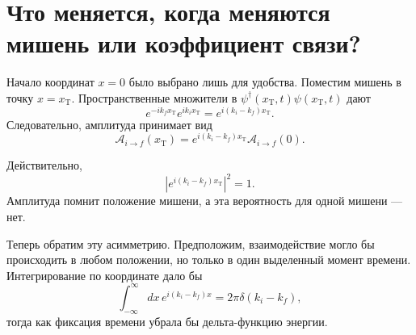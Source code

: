 \section{Что меняется, когда меняются мишень или коэффициент связи?}

Начало координат \(x=0\) было выбрано лишь для удобства. Поместим мишень в точку \(x=x_{\mathrm T}\). Пространственные множители в \(\psi^\dagger(x_{\mathrm T},t)\psi(x_{\mathrm T},t)\) дают
\begin{equation}
e^{-ik_f x_{\mathrm T}}e^{ik_i x_{\mathrm T}}
=e^{i(k_i-k_f)x_{\mathrm T}}.
\end{equation}
Следовательно, амплитуда принимает вид
\begin{equation}
\mathcal A_{i\to f}(x_{\mathrm T})
=e^{i(k_i-k_f)x_{\mathrm T}}
\mathcal A_{i\to f}(0).
\end{equation}

\begin{classroomqa}
\end{classroomqa}

Действительно,
\begin{equation}
\left|e^{i(k_i-k_f)x_{\mathrm T}}\right|^2=1.
\end{equation}
Амплитуда помнит положение мишени, а эта вероятность для одной мишени — нет.

Теперь обратим эту асимметрию. Предположим, взаимодействие могло бы происходить в любом положении, но только в один выделенный момент времени. Интегрирование по координате дало бы
\begin{equation}
\int_{-\infty}^{\infty}dx\,
e^{i(k_i-k_f)x}
=2\pi\delta(k_i-k_f),
\end{equation}
тогда как фиксация времени убрала бы дельта-функцию энергии.

\begin{classroomqa}
\end{classroomqa}

